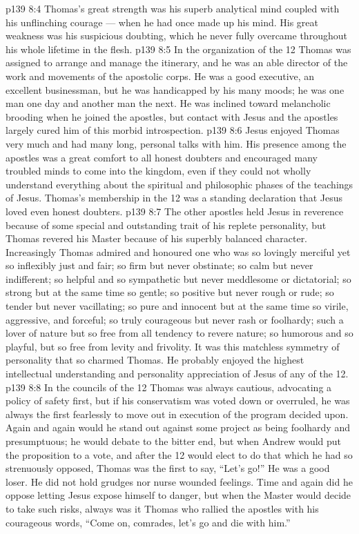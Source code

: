 \vs p139 8:4 Thomas’s great strength was his superb analytical mind coupled with his unflinching courage --- when he had once made up his mind. His great weakness was his suspicious doubting, which he never fully overcame throughout his whole lifetime in the flesh.
\vs p139 8:5 In the organization of the 12 Thomas was assigned to arrange and manage the itinerary, and he was an able director of the work and movements of the apostolic corps. He was a good executive, an excellent businessman, but he was handicapped by his many moods; he was one man one day and another man the next. He was inclined toward melancholic brooding when he joined the apostles, but contact with Jesus and the apostles largely cured him of this morbid introspection.
\vs p139 8:6 Jesus enjoyed Thomas very much and had many long, personal talks with him. His presence among the apostles was a great comfort to all honest doubters and encouraged many troubled minds to come into the kingdom, even if they could not wholly understand everything about the spiritual and philosophic phases of the teachings of Jesus. Thomas’s membership in the 12 was a standing declaration that Jesus loved even honest doubters.
\vs p139 8:7 \pc The other apostles held Jesus in reverence because of some special and outstanding trait of his replete personality, but Thomas revered his Master because of his superbly balanced character. Increasingly Thomas admired and honoured one who was so lovingly merciful yet so inflexibly just and fair; so firm but never obstinate; so calm but never indifferent; so helpful and so sympathetic but never meddlesome or dictatorial; so strong but at the same time so gentle; so positive but never rough or rude; so tender but never vacillating; so pure and innocent but at the same time so virile, aggressive, and forceful; so truly courageous but never rash or foolhardy; such a lover of nature but so free from all tendency to revere nature; so humorous and so playful, but so free from levity and frivolity. It was this matchless symmetry of personality that so charmed Thomas. He probably enjoyed the highest intellectual understanding and personality appreciation of Jesus of any of the 12.
\vs p139 8:8 \pc In the councils of the 12 Thomas was always cautious, advocating a policy of safety first, but if his conservatism was voted down or overruled, he was always the first fearlessly to move out in execution of the program decided upon. Again and again would he stand out against some project as being foolhardy and presumptuous; he would debate to the bitter end, but when Andrew would put the proposition to a vote, and after the 12 would elect to do that which he had so strenuously opposed, Thomas was the first to say, “Let’s go!” He was a good loser. He did not hold grudges nor nurse wounded feelings. Time and again did he oppose letting Jesus expose himself to danger, but when the Master would decide to take such risks, always was it Thomas who rallied the apostles with his courageous words, “Come on, comrades, let’s go and die with him.”
